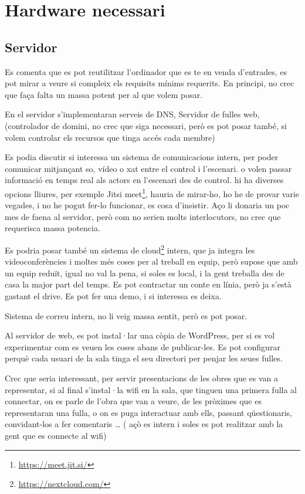 \documentclass[
  10pt,
]{krantz}
\DeclareRobustCommand{\href}[2]{#2\footnote{\url{#1}}}
\begin{document}
\hypertarget{hardware-necessari}{%
\section{Hardware necessari}\label{hardware-necessari}}

\hypertarget{servidor}{%
\subsection{Servidor}\label{servidor}}

Es comenta que es pot reutilitzar l'ordinador que es te en venda d'entrades, es pot mirar a veure si compleix els requisits mínims requerits. En principi, no crec que faça falta un massa potent per al que volem posar.

En el servidor s'implementaran serveis de DNS, Servidor de fulles web, (controlador de domini, no crec que siga necessari, però es pot posar també, si volem controlar els recursos que tinga accés cada membre)

Es podia discutir si interessa un sistema de comunicacions intern, per poder comunicar mitjançant so, vídeo o xat entre el control i l'escenari. o volen passar informació en temps real als actors en l'escenari des de control. hi ha diverses opcions lliures, per exemple \href{https://meet.jit.si/}{Jitsi meet}, hauria de mirar-ho, ho he de provar varie vegades, i no he pogut fer-lo funcionar, es cosa d'insistir. Aço li donaria un poc mes de faena al servidor, però com no serien molts interlocutors, no crec que requerisca massa potencia.

Es podria posar també un sistema de \href{https://nextcloud.com/}{cloud} intern, que ja integra les videoconferències i moltes més coses per al treball en equip, però supose que amb un equip reduït, igual no val la pena, si soles es local, i la gent treballa des de casa la major part del temps. Es pot contractar un conte en línia, però ja s'està gastant el drive. Es pot fer una demo, i si interessa es deixa.

Sistema de correu intern, no li veig massa sentit, però es pot posar.

Al servidor de web, es pot instal·lar una còpia de WordPress, per si es vol experimentar com es veuen les coses abans de publicar-les. Es pot configurar perquè cada usuari de la sala tinga el seu directori per penjar les seues fulles.

Crec que seria interessant, per servir presentacions de les obres que es van a representar, si al final s'instal·la wifi en la sala, que tinguen una primera fulla al connectar, on es parle de l'obra que van a veure, de les pròximes que es representaran una fulla, o on es puga interactuar amb ells, passant qüestionaris, convidant-los a fer comentaris \ldots{} ( açò es intern i soles es pot realitzar amb la gent que es connecte al wifi)
\end{document}
